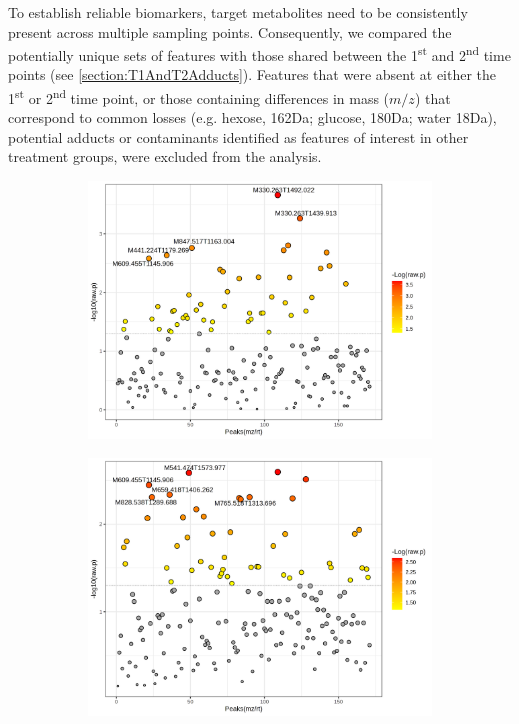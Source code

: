 To establish reliable biomarkers, target metabolites need to be consistently present across multiple sampling points. Consequently, we compared the potentially unique sets of features with those shared between the 1\textsuperscript{st} and 2\textsuperscript{nd} time points (see \ref{section:T1AndT2Adducts}). Features that were absent at either the 1\textsuperscript{st} or 2\textsuperscript{nd} time point, or those containing differences in mass ($m/z$) that correspond to common losses (e.g. hexose, 162Da; glucose, 180Da; water 18Da), potential adducts or contaminants identified as features of interest in other treatment groups, were excluded from the analysis.

\begin{figure}[hp!]
  \centering
  \begin{subfigure}[b]{0.49\textwidth}
    \includegraphics[width=\textwidth]{Figures/Sig171FeaturesRedGroupsDroVsConSecondTimePoint_t-test.png}
    \caption{}
    \label{fig:DroVsCon_t-test}
  \end{subfigure}
  \begin{subfigure}[b]{0.49\textwidth}
    \includegraphics[width=\textwidth]{Figures/Sig171FeaturesRedSamplesXvmVsConSecondTimePoint_t_test.png}

\end{subfigure}
\end{figure}
